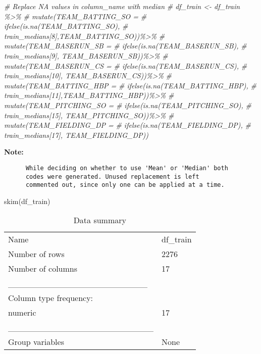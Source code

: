\documentclass[
]{article}
\newenvironment{Shaded}{\begin{snugshade}}{\end{snugshade}}
\newcommand{\CommentTok}[1]{\textcolor[rgb]{0.56,0.35,0.01}{\textit{#1}}}
\newcommand{\FunctionTok}[1]{\textcolor[rgb]{0.00,0.00,0.00}{#1}}
\newcommand{\NormalTok}[1]{#1}
\begin{document}
\begin{Shaded}
\begin{Highlighting}[]
\CommentTok{\# Replace NA values in \textquotesingle{}column\_name\textquotesingle{} with \textquotesingle{}median\textquotesingle{}}
\CommentTok{\# df\_train \textless{}{-} df\_train \%\textgreater{}\%}
\CommentTok{\#   mutate(TEAM\_BATTING\_SO =}
\CommentTok{\#            ifelse(is.na(TEAM\_BATTING\_SO),}
\CommentTok{\#                   train\_medians[8],TEAM\_BATTING\_SO))\%\textgreater{}\% }
\CommentTok{\#   mutate(TEAM\_BASERUN\_SB = }
\CommentTok{\#            ifelse(is.na(TEAM\_BASERUN\_SB),}
\CommentTok{\#                   train\_medians[9], TEAM\_BASERUN\_SB))\%\textgreater{}\%}
\CommentTok{\#   mutate(TEAM\_BASERUN\_CS =}
\CommentTok{\#            ifelse(is.na(TEAM\_BASERUN\_CS),}
\CommentTok{\#                   train\_medians[10], TEAM\_BASERUN\_CS))\%\textgreater{}\%}
\CommentTok{\#   mutate(TEAM\_BATTING\_HBP = }
\CommentTok{\#            ifelse(is.na(TEAM\_BATTING\_HBP),}
\CommentTok{\#                   train\_medians[11],TEAM\_BATTING\_HBP))\%\textgreater{}\%}
\CommentTok{\#   mutate(TEAM\_PITCHING\_SO =}
\CommentTok{\#            ifelse(is.na(TEAM\_PITCHING\_SO),}
\CommentTok{\#                   train\_medians[15], TEAM\_PITCHING\_SO))\%\textgreater{}\%}
\CommentTok{\#   mutate(TEAM\_FIELDING\_DP =}
\CommentTok{\#            ifelse(is.na(TEAM\_FIELDING\_DP),}
\CommentTok{\#                   train\_medians[17], TEAM\_FIELDING\_DP))}
\end{Highlighting}
\end{Shaded}

\textbf{Note:}

\begin{verbatim}
      While deciding on whether to use 'Mean' or 'Median' both 
      codes were generated. Unused replacement is left 
      commented out, since only one can be applied at a time.
\end{verbatim}

\begin{Shaded}
\begin{Highlighting}[]
\FunctionTok{skim}\NormalTok{(df\_train)}
\end{Highlighting}
\end{Shaded}

\begin{longtable}[]{@{}ll@{}}
\caption{Data summary}\tabularnewline
\toprule()
\endhead
Name & df\_train \\
Number of rows & 2276 \\
Number of columns & 17 \\
\_\_\_\_\_\_\_\_\_\_\_\_\_\_\_\_\_\_\_\_\_\_\_ & \\
Column type frequency: & \\
numeric & 17 \\
\_\_\_\_\_\_\_\_\_\_\_\_\_\_\_\_\_\_\_\_\_\_\_\_ & \\
Group variables & None \\
\bottomrule()
\end{longtable}
\end{document}
